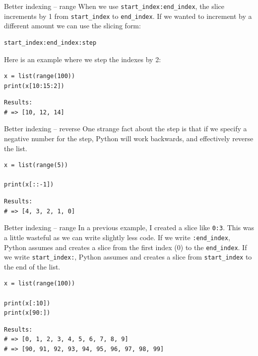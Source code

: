 \documentclass[10pt]{beamer}
\begin{document}
\begin{frame}[label={sec:org11c8435},fragile]{Better indexing -- range}
 When we use \texttt{start\_index:end\_index}, the slice increments by 1 from \texttt{start\_index} to
\texttt{end\_index}. If we wanted to increment by a different amount we can use the slicing
form:

\begin{verbatim}
start_index:end_index:step
\end{verbatim}

Here is an example where we step the indexes by 2:

\begin{verbatim}
x = list(range(100))
print(x[10:15:2])
\end{verbatim}

\begin{verbatim}
Results: 
# => [10, 12, 14]
\end{verbatim}
\end{frame}

\begin{frame}[label={sec:org1d191ba},fragile]{Better indexing -- reverse}
 One strange fact about the step is that if we specify a negative number for the step,
Python will work backwards, and effectively reverse the list.

\begin{verbatim}
x = list(range(5))

print(x[::-1])
\end{verbatim}

\begin{verbatim}
Results: 
# => [4, 3, 2, 1, 0]
\end{verbatim}
\end{frame}

\begin{frame}[label={sec:org76fa54c},fragile]{Better indexing -- range}
 In a previous example, I created a slice like \texttt{0:3}. This was a little wasteful as we
can write slightly less code. If we write \texttt{:end\_index}, Python assumes and creates a
slice from the first index (0) to the \texttt{end\_index}. If we write \texttt{start\_index:}, Python
assumes and creates a slice from \texttt{start\_index} to the end of the list.

\begin{verbatim}
x = list(range(100))

print(x[:10])
print(x[90:])
\end{verbatim}

\begin{verbatim}
Results: 
# => [0, 1, 2, 3, 4, 5, 6, 7, 8, 9]
# => [90, 91, 92, 93, 94, 95, 96, 97, 98, 99]
\end{verbatim}
\end{frame}
\end{document}
